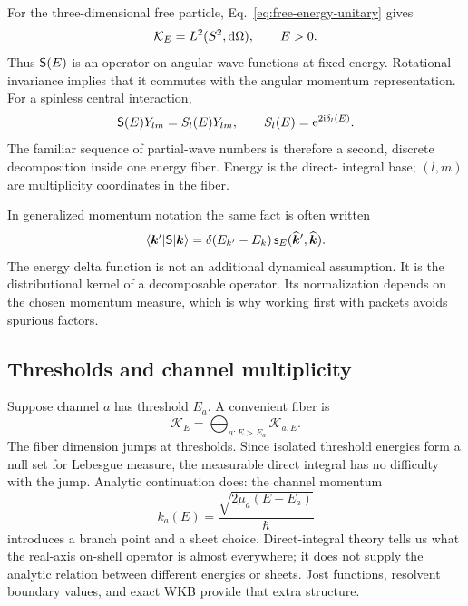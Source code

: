 For the three-dimensional free particle, Eq.~\eqref{eq:free-energy-unitary}
gives
\begin{equation}
  \mathcal K_E=L^2(S^2,\mathrm{d}\Omega),
  \qquad E>0.
  \label{eq:free-fiber-angular}
\end{equation}
Thus $\mathsf{S}(E)$ is an operator on angular wave functions at fixed
energy.  Rotational invariance implies that it commutes with the angular
momentum representation.  For a spinless central interaction,
\begin{equation}
  \mathsf{S}(E)Y_{lm}
  =S_l(E)Y_{lm},
  \qquad
  S_l(E)=\mathrm{e}^{2\mathrm{i}\delta_l(E)}.
  \label{eq:S-fiber-partial-waves}
\end{equation}
The familiar sequence of partial-wave numbers is therefore a second,
discrete decomposition inside one energy fiber.  Energy is the direct-
integral base; $(l,m)$ are multiplicity coordinates in the fiber.

In generalized momentum notation the same fact is often written
\begin{equation}
  \langle \bm k' \rvert\mathsf{S}\lvert \bm k \rangle
  =\delta(E_{k'}-E_k)\,
   \mathsf s_E(\widehat{\bm k}',\widehat{\bm k}) .
  \label{eq:S-kernel-energy-delta}
\end{equation}
The energy delta function is not an additional dynamical assumption.  It is
the distributional kernel of a decomposable operator.  Its normalization
depends on the chosen momentum measure, which is why working first with
packets avoids spurious factors.

\subsection{Thresholds and channel multiplicity}

Suppose channel $a$ has threshold $E_a$.  A convenient fiber is
\begin{equation}
  \mathcal K_E
  =\bigoplus_{a:E>E_a}\mathcal K_{a,E}.
  \label{eq:open-channel-fiber}
\end{equation}
The fiber dimension jumps at thresholds.  Since isolated threshold energies
form a null set for Lebesgue measure, the measurable direct integral has no
difficulty with the jump.  Analytic continuation does: the channel momentum
\begin{equation}
  k_a(E)=\frac{\sqrt{2\mu_a(E-E_a)}}{\hbar}
  \label{eq:channel-momentum-threshold}
\end{equation}
introduces a branch point and a sheet choice.  Direct-integral theory tells us
what the real-axis on-shell operator is almost everywhere; it does not supply
the analytic relation between different energies or sheets.  Jost functions,
resolvent boundary values, and exact WKB provide that extra structure.

